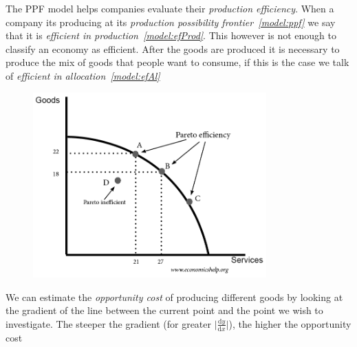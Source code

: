 \documentclass[english,course, draft]{Notes}
\newcommand{\ita}[1]{\textit{#1}}
\begin{document}

\par{The PPF model helps companies evaluate their \ita{production efficiency}. When a company its producing at its \ita{production possibility frontier~\ref{model:ppf}} we say that it is \ita{efficient in production~\ref{model:efProd}}. This however is not enough to classify an economy as efficient. After the goods are produced it is necessary to produce the mix of goods that people want to consume, if this is the case we talk of \ita{efficient in allocation~\ref{model:efAl}}}


\begin{figure}[ht]
\centering
\includegraphics[width=0.8\textwidth]{ppf.png}
\end{figure}

\par{We can estimate the \ita{opportunity cost} of producing different goods by looking at the gradient of the line between the current point and the point we wish to investigate. The steeper the gradient (for greater $\Big|\frac{\mathrm{d}y}{\mathrm{d}x}\Big| $), the higher the opportunity cost}
\end{document}
